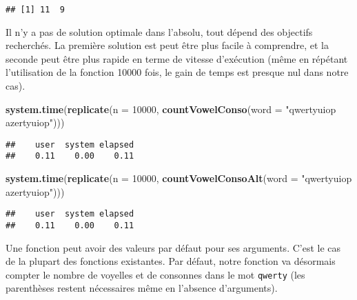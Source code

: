 \documentclass[]{book}
\newenvironment{Shaded}{\begin{snugshade}}{\end{snugshade}}
\newcommand{\KeywordTok}[1]{\textcolor[rgb]{0.13,0.29,0.53}{\textbf{#1}}}
\newcommand{\DataTypeTok}[1]{\textcolor[rgb]{0.13,0.29,0.53}{#1}}
\newcommand{\DecValTok}[1]{\textcolor[rgb]{0.00,0.00,0.81}{#1}}
\newcommand{\StringTok}[1]{\textcolor[rgb]{0.31,0.60,0.02}{#1}}
\newcommand{\NormalTok}[1]{#1}
\theoremstyle{definition}
\theoremstyle{definition}
\theoremstyle{definition}
\theoremstyle{remark}
\begin{document}
\begin{verbatim}
## [1] 11  9
\end{verbatim}

Il n'y a pas de solution optimale dans l'absolu, tout dépend des
objectifs recherchés. La première solution est peut être plus facile à
comprendre, et la seconde peut être plus rapide en terme de vitesse
d'exécution (même en répétant l'utilisation de la fonction 10000 fois,
le gain de temps est presque nul dans notre cas).

\begin{Shaded}
\begin{Highlighting}[]
\KeywordTok{system.time}\NormalTok{(}\KeywordTok{replicate}\NormalTok{(}\DataTypeTok{n =} \DecValTok{10000}\NormalTok{, }\KeywordTok{countVowelConso}\NormalTok{(}\DataTypeTok{word =} \StringTok{"qwertyuiop azertyuiop"}\NormalTok{)))}
\end{Highlighting}
\end{Shaded}

\begin{verbatim}
##    user  system elapsed 
##    0.11    0.00    0.11
\end{verbatim}

\begin{Shaded}
\begin{Highlighting}[]
\KeywordTok{system.time}\NormalTok{(}\KeywordTok{replicate}\NormalTok{(}\DataTypeTok{n =} \DecValTok{10000}\NormalTok{, }\KeywordTok{countVowelConsoAlt}\NormalTok{(}\DataTypeTok{word =} \StringTok{"qwertyuiop azertyuiop"}\NormalTok{)))}
\end{Highlighting}
\end{Shaded}

\begin{verbatim}
##    user  system elapsed 
##    0.11    0.00    0.11
\end{verbatim}

Une fonction peut avoir des valeurs par défaut pour ses arguments. C'est
le cas de la plupart des fonctions existantes. Par défaut, notre
fonction va désormais compter le nombre de voyelles et de consonnes dans
le mot \texttt{qwerty} (les parenthèses restent nécessaires même en
l'absence d'arguments).
\end{document}
